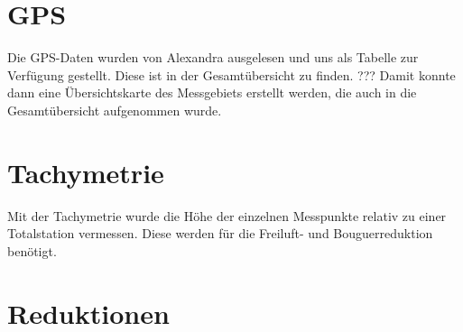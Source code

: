 
\section{GPS}

Die GPS-Daten wurden von Alexandra ausgelesen und uns als Tabelle zur Verfügung gestellt. Diese ist in der Gesamtübersicht zu finden. ??? Damit konnte dann eine Übersichtskarte des Messgebiets erstellt werden, die auch in die Gesamtübersicht aufgenommen wurde.

\section{Tachymetrie}

Mit der Tachymetrie wurde die Höhe der einzelnen Messpunkte relativ zu einer Totalstation vermessen. Diese werden für die Freiluft- und Bouguerreduktion benötigt.

\section{Reduktionen}

